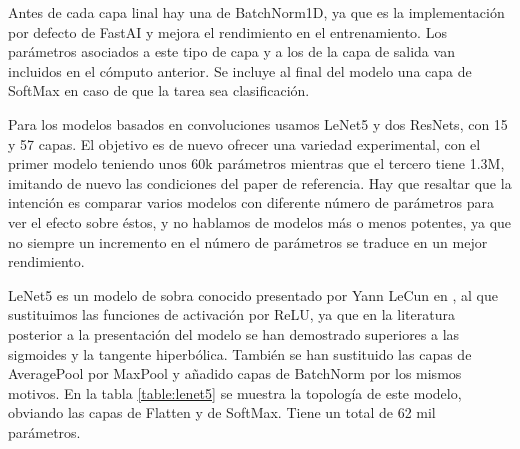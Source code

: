 Antes de cada capa linal hay una de BatchNorm1D, ya que es la implementación por defecto de FastAI y mejora el rendimiento en el entrenamiento. Los parámetros asociados a este tipo de capa y a los de la capa de salida van incluidos en el cómputo anterior. Se incluye al final del modelo una capa de SoftMax en caso de que la tarea sea clasificación.

Para los modelos basados en convoluciones usamos LeNet5 y dos ResNets, con 15 y 57 capas. El objetivo es de nuevo ofrecer una variedad experimental, con el primer modelo teniendo unos 60k parámetros mientras que el tercero tiene 1.3M, imitando de nuevo las condiciones del paper de referencia. Hay que resaltar que la intención es comparar varios modelos con diferente número de parámetros para ver el efecto sobre éstos, y no hablamos de modelos más o menos potentes, ya que no siempre un incremento en el número de parámetros se traduce en un mejor rendimiento.


LeNet5 es un modelo de sobra conocido presentado por Yann LeCun en \cite{lenet5}, al que sustituimos las funciones de activación por ReLU, ya que en la literatura posterior a la presentación del modelo se han demostrado superiores a las sigmoides y la tangente hiperbólica. También se han sustituido las capas de AveragePool por MaxPool y añadido capas de BatchNorm por los mismos motivos. En la tabla \ref{table:lenet5} se muestra la topología de este modelo, obviando las capas de Flatten y de SoftMax. Tiene un total de 62 mil parámetros.



